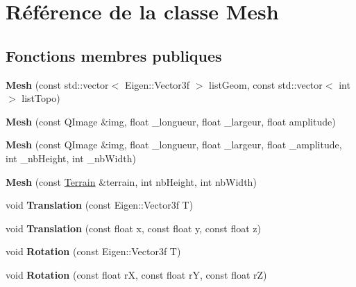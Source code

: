 \hypertarget{class_mesh}{}\section{Référence de la classe Mesh}
\label{class_mesh}
\subsection*{Fonctions membres publiques}
\begin{DoxyCompactItemize}
\item 
\hypertarget{class_mesh_a7ed6cd1a888646d805303d537416da0e}{}{\bfseries Mesh} (const std\+::vector$<$ Eigen\+::\+Vector3f $>$ list\+Geom, const std\+::vector$<$ int $>$ list\+Topo)\label{class_mesh_a7ed6cd1a888646d805303d537416da0e}

\item 
\hypertarget{class_mesh_a8cd4ad19c82725e6397e30bb983f404a}{}{\bfseries Mesh} (const Q\+Image \&img, float \+\_\+longueur, float \+\_\+largeur, float amplitude)\label{class_mesh_a8cd4ad19c82725e6397e30bb983f404a}

\item 
\hypertarget{class_mesh_a40f919a47e17b7822bbda0a665064c49}{}{\bfseries Mesh} (const Q\+Image \&img, float \+\_\+longueur, float \+\_\+largeur, float \+\_\+amplitude, int \+\_\+nb\+Height, int \+\_\+nb\+Width)\label{class_mesh_a40f919a47e17b7822bbda0a665064c49}

\item 
\hypertarget{class_mesh_a48a89492a84da25302d08a66adc3f0fa}{}{\bfseries Mesh} (const \hyperlink{class_terrain}{Terrain} \&terrain, int nb\+Height, int nb\+Width)\label{class_mesh_a48a89492a84da25302d08a66adc3f0fa}

\item 
\hypertarget{class_mesh_abd4c622a1db5d219778e69e6eb9edd31}{}void {\bfseries Translation} (const Eigen\+::\+Vector3f T)\label{class_mesh_abd4c622a1db5d219778e69e6eb9edd31}

\item 
\hypertarget{class_mesh_abdb59782fb5bd09ae504796f2a62032a}{}void {\bfseries Translation} (const float x, const float y, const float z)\label{class_mesh_abdb59782fb5bd09ae504796f2a62032a}

\item 
\hypertarget{class_mesh_a755af0bedd07e7d36e9ad6321ca037b5}{}void {\bfseries Rotation} (const Eigen\+::\+Vector3f T)\label{class_mesh_a755af0bedd07e7d36e9ad6321ca037b5}

\item 
\hypertarget{class_mesh_ab9233fd2b1023b6c6f28dfe6810214ae}{}void {\bfseries Rotation} (const float r\+X, const float r\+Y, const float r\+Z)\label{class_mesh_ab9233fd2b1023b6c6f28dfe6810214ae}


\end{DoxyCompactItemize}

